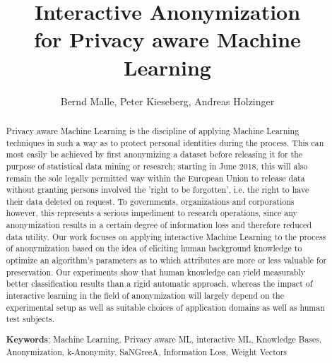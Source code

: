 \documentclass{llncs}
\begin{document}
\title{Interactive Anonymization\\
for Privacy aware Machine Learning}

\author{Bernd Malle, Peter Kieseberg, Andreas Holzinger}

	
\maketitle

\begin{abstract}

Privacy aware Machine Learning is the discipline of applying Machine Learning techniques in such a way as to protect personal identities during the process. This can most easily be achieved by first anonymizing a dataset before releasing it for the purpose of statistical data mining or research; starting in June 2018, this will also remain the sole legally permitted way within the European Union to release data without granting persons involved the 'right to be forgotten', i.e. the right to have their data deleted on request. To governments, organizations and corporations however, this represents a serious impediment to research operations, since any anonymization results in a certain degree of information loss and therefore reduced data utility. Our work focuses on applying interactive Machine Learning to the process of anonymization based on the idea of eliciting human background knowledge to optimize an algorithm's parameters as to which attributes are more or less valuable for preservation. Our experiments show that human knowledge can yield measurably better classification results than a rigid automatic approach, whereas the impact of interactive learning in the field of anonymization will largely depend on the experimental setup as well as suitable choices of application domains as well as human test subjects.


\medskip

\textbf{Keywords}: Machine Learning, Privacy aware ML, interactive ML, Knowledge Bases, Anonymization, k-Anonymity, SaNGreeA, Information Loss, Weight Vectors


\end{abstract}
\end{document}
